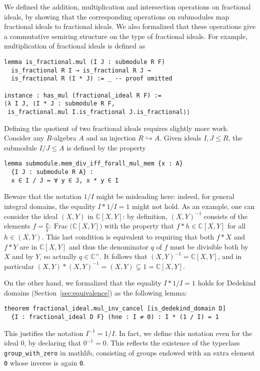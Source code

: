 \documentclass[sn-mathphys]{sn-jnl}%
\renewcommand{\C}{\mathbb{C}}
\newcommand{\lean}[1]{\texttt{#1}\xspace}
\newcommand{\mathlib}{\textsf{mathlib}\xspace}
\DeclareMathOperator{\Frac}{Frac}
\begin{document}
We defined the addition, multiplication and intersection operations on fractional ideals,
by showing that the corresponding operations on submodules map fractional ideals to fractional ideals.
We also formalized that these operations give a commutative semiring structure on the type of fractional ideals.
For example, multiplication of fractional ideals is defined as
\begin{lstlisting}
lemma is_fractional.mul (I J : submodule R F)
  is_fractional R I → is_fractional R J →
  is_fractional R (I * J) := _ -- proof omitted

instance : has_mul (fractional_ideal R F) :=
⟨λ I J, ⟨I * J : submodule R F,
 is_fractional.mul I.is_fractional J.is_fractional⟩⟩
\end{lstlisting}

Defining the quotient of two fractional ideals requires slightly more work. Consider any $R$-algebra $A$ and an injection $R\hookrightarrow A$. Given ideals $I,J\le R$, the submodule $I / J\le A$
is defined by the property
\pagebreak[3] %
\begin{lstlisting}
lemma submodule.mem_div_iff_forall_mul_mem {x : A}
  {I J : submodule R A} :
  x ∈ I / J ↔ ∀ y ∈ J, x * y ∈ I
\end{lstlisting}
Beware that the notation $1/I$ might be misleading here: indeed, for general integral domains, the equality $I\ast 1/I=1$ might not hold. As an example, one can consider the ideal $(X,Y)$ in $\C[X,Y]$: by definition, $(X, Y)^{-1}$ consists of the elements $f=\frac{p}{q} \colon \Frac \bigl(\C[X,Y]\bigr)$ with the property that $f \ast h \in \C[X,Y]$ for all $h \in (X,Y)$. This last condition is equivalent to requiring that both $f \ast X$ and $f \ast Y$ are in $\C[X,Y]$ and thus the denominator $q$ of $f$ must be divisible both by $X$ and by $Y$, so actually $q\in\C^\times$. It follows that $(X,Y)^{-1}=\C[X,Y]$, and in particular $(X,Y)\ast (X,Y)^{-1}=(X,Y)\subsetneq 1=\C[X,Y]$.

On the other hand, we formalized that the equality $I\ast 1/I=1$ holds for Dedekind domains (Section~\ref{sec:equivalence}) as the following lemma:
\begin{lstlisting}
theorem fractional_ideal.mul_inv_cancel [is_dedekind_domain D]
  {I : fractional_ideal D F} (hne : I ≠ 0) : I * (1 / I) = 1
\end{lstlisting}
This justifies the notation $I^{-1}=1/I$. In fact, we define this notation even for the ideal $0$, by declaring that $0^{-1}=0$. This reflects the existence of the typeclass \lean{group\_with\_zero} in \mathlib, consisting of groups endowed with an extra element \lean{0} whose inverse is again \lean{0}.
\end{document}
